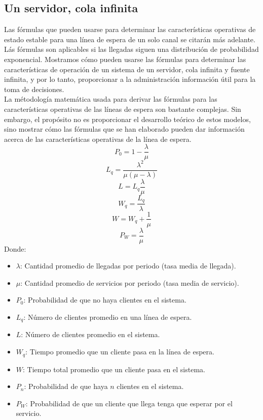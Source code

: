 \documentclass[letterpaper, 12pt]{article}
\begin{document}
    \subsection*{Un servidor, cola infinita}
    \justify
    Las fórmulas que pueden usarse para determinar las características operativas de estado estable para una línea de espera de un solo canal se citarán más adelante.
    Lás fórmulas son aplicables si las llegadas siguen una distribución de probabilidad exponencial. Mostramos cómo pueden usarse las fórmulas para determinar las características
    de operación de un sistema de un servidor, cola infinita y fuente infinita, y por lo tanto, proporcionar a la administración información útil para la toma de decisiones.\\\newline
    La métodología matemática usada para derivar las fórmulas para las características operativas de las líneas de espera son bastante complejas. Sin embargo, el propósito no es proporcionar
    el desarrollo teórico de estos modelos, sino mostrar cómo las fórmulas que se han elaborado pueden dar información acerca de las características operativas de la línea de espera.
    \[P_0=1-\frac{\lambda}{\mu}\]
    \[L_q=\frac{\lambda^2}{\mu(\mu-\lambda)}\]
    \[L=L_q\frac{\lambda}{\mu}\]
    \[W_q=\frac{L_q}{\lambda}\]
    \[W=W_q+\frac{1}{\mu}\]
    \[P_W=\frac{\lambda}{\mu}\]
    Donde:
    \begin{itemize}
        \item \(\lambda\): Cantidad promedio de llegadas por periodo (tasa media de llegada).
        \item \(\mu\): Cantidad promedio de servicios por periodo (tasa media de servicio).
        \item \(P_0\): Probabilidad de que no haya clientes en el sistema.
        \item \(L_q\): Número de clientes promedio en una línea de espera.
        \item \(L\): Número de clientes promedio en el sistema.
        \item \(W_q\): Tiempo promedio que un cliente pasa en la línea de espera.
        \item \(W\): Tiempo total promedio que un cliente pasa en el sistema.
        \item \(P_n\): Probabilidad de que haya \(n\) clientes en el sistema.
        \item \(P_W\): Probabilidad de que un cliente que llega tenga que esperar por el servicio.
    \end{itemize}
\end{document}
